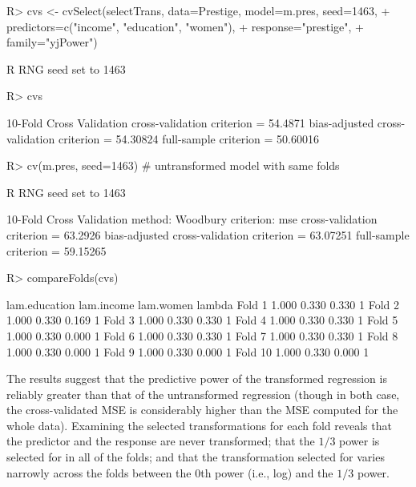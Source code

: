 \documentclass[
]{jss}
\begin{document}
\begin{CodeChunk}
\begin{CodeInput}
R> cvs <- cvSelect(selectTrans, data=Prestige, model=m.pres, seed=1463,
+                 predictors=c("income", "education", "women"),
+                 response="prestige",
+                 family="yjPower")
\end{CodeInput}
\begin{CodeOutput}
R RNG seed set to 1463
\end{CodeOutput}
\begin{CodeInput}
R> cvs
\end{CodeInput}
\begin{CodeOutput}
10-Fold Cross Validation
cross-validation criterion = 54.4871
bias-adjusted cross-validation criterion = 54.30824
full-sample criterion = 50.60016 
\end{CodeOutput}
\begin{CodeInput}
R> cv(m.pres, seed=1463) # untransformed model with same folds
\end{CodeInput}
\begin{CodeOutput}
R RNG seed set to 1463
\end{CodeOutput}
\begin{CodeOutput}
10-Fold Cross Validation
method: Woodbury
criterion: mse
cross-validation criterion = 63.2926
bias-adjusted cross-validation criterion = 63.07251
full-sample criterion = 59.15265 
\end{CodeOutput}
\begin{CodeInput}
R> compareFolds(cvs)
\end{CodeInput}
\begin{CodeOutput}
        lam.education lam.income lam.women lambda
Fold 1          1.000      0.330     0.330      1
Fold 2          1.000      0.330     0.169      1
Fold 3          1.000      0.330     0.330      1
Fold 4          1.000      0.330     0.330      1
Fold 5          1.000      0.330     0.000      1
Fold 6          1.000      0.330     0.330      1
Fold 7          1.000      0.330     0.330      1
Fold 8          1.000      0.330     0.000      1
Fold 9          1.000      0.330     0.000      1
Fold 10         1.000      0.330     0.000      1
\end{CodeOutput}
\end{CodeChunk}

The results suggest that the predictive power of the transformed
regression is reliably greater than that of the untransformed regression
(though in both case, the cross-validated MSE is considerably higher
than the MSE computed for the whole data). Examining the selected
transformations for each fold reveals that the predictor
 and the response  are never transformed;
that the \(1/3\) power is selected for  in all of the
folds; and that the transformation selected for  varies
narrowly across the folds between the \(0\)th power (i.e., log) and the
\(1/3\) power.
\end{document}

